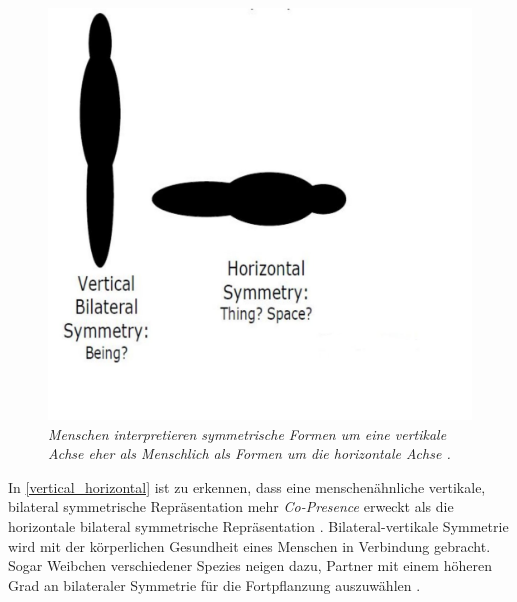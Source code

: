 \documentclass[a4paper,11pt]{article}%
\renewcommand{\\}{\vspace*{0.5\baselineskip} \newline}
\begin{document}
	\begin{figure}[b!]
		\begin{footnotesize}
		\centering
			\includegraphics[scale= 0.3]{Abbildungen/Symmetry.JPG}
			\caption[Vertical and horizontal beeings]{\textit{Menschen interpretieren symmetrische Formen um eine vertikale Achse eher als \dq{}Menschlich\dq{} als Formen um die horizontale Achse \citep{biocca2002defining}. }}
			\label{vertical_horizontal}
		\end{footnotesize}
	\end{figure}

In \autoref{vertical_horizontal} ist zu erkennen, dass eine menschenähnliche vertikale, bilateral symmetrische Repräsentation mehr \textit{Co-Presence} erweckt als die horizontale bilateral symmetrische Repräsentation \citep[p.546-551]{thornhill1998relative}.
Bilateral-vertikale Symmetrie wird mit der körperlichen Gesundheit eines Menschen in Verbindung gebracht. Sogar Weibchen verschiedener Spezies neigen dazu, Partner mit einem höheren Grad an bilateraler Symmetrie für die Fortpflanzung auszuwählen \citep[p. 659–669]{rhodes1998facial} \citep{biocca2002defining} \citep[p.233–242]{grammer1994human}.
\end{document}
